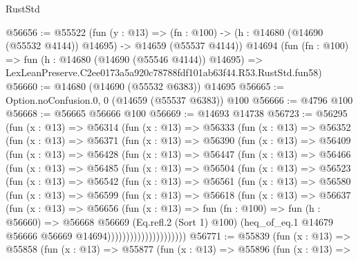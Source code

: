 \begin{lexlean}{RustStd}
\begin{coremodule}
@56656 := @55522
    (fun (y : @13) =>
    (fn : @100) -> (h : @14680 (@14690 (@55532 @4144)) @14695) -> @14659 (@55537 @4144))
    @14694
    (fun (fn : @100) =>
    fun (h : @14680 (@14690 (@55546 @4144)) @14695) =>
    LexLeanPreserve.C2ee0173a5a920c78788fdf101ab63f44.R53.RustStd.fun58)
@56660 := @14680 (@14690 (@55532 @6383)) @14695
@56665 := Option.noConfusion.{0, 0} (@14659 (@55537 @6383)) @100
@56666 := @4796 @100
@56668 := @56665 @56666 @100
@56669 := @14693 @14738
@56723 := @56295
    (fun (x : @13) =>
    @56314
      (fun (x : @13) =>
      @56333
        (fun (x : @13) =>
        @56352
          (fun (x : @13) =>
          @56371
            (fun (x : @13) =>
            @56390
              (fun (x : @13) =>
              @56409
                (fun (x : @13) =>
                @56428
                  (fun (x : @13) =>
                  @56447
                    (fun (x : @13) =>
                    @56466
                      (fun (x : @13) =>
                      @56485
                        (fun (x : @13) =>
                        @56504
                          (fun (x : @13) =>
                          @56523
                            (fun (x : @13) =>
                            @56542
                              (fun (x : @13) =>
                              @56561
                                (fun (x : @13) =>
                                @56580
                                  (fun (x : @13) =>
                                  @56599
                                    (fun (x : @13) =>
                                    @56618
                                      (fun (x : @13) =>
                                      @56637
                                        (fun (x : @13) =>
                                        @56656
                                          (fun (x : @13) =>
                                          fun (fn : @100) =>
                                          fun (h : @56660) =>
                                          @56668
                                            @56669
                                            (Eq.refl.{2} (Sort 1) @100)
                                            (heq_of_eq.{1}
                                              @14679
                                              @56666
                                              @56669
                                              @14694)))))))))))))))))))))
@56771 := @55839
    (fun (x : @13) =>
    @55858
      (fun (x : @13) =>
      @55877
        (fun (x : @13) =>
        @55896
          (fun (x : @13) =>

\end{coremodule}
\end{lexlean}
